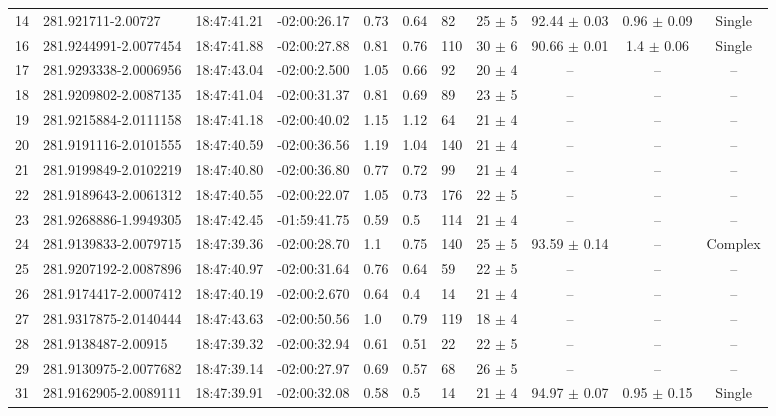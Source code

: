 \begin{table}[htbp!]
\begin{tabular}{llllllllccc}
14  &  281.921711-2.00727  &  18:47:41.21  &  -02:00:26.17  &  0.73  &  0.64  &  82  &  25 $\pm$ 5  &  92.44 $\pm$ 0.03  &  0.96 $\pm$ 0.09  &  Single \\
16  &  281.9244991-2.0077454  &  18:47:41.88  &  -02:00:27.88  &  0.81  &  0.76  &  110  &  30 $\pm$ 6  &  90.66 $\pm$ 0.01  &  1.4 $\pm$ 0.06  &  Single \\
17  &  281.9293338-2.0006956  &  18:47:43.04  &  -02:00:2.500  &  1.05  &  0.66  &  92  &  20 $\pm$ 4  &  --  &  --  &  -- \\
18  &  281.9209802-2.0087135  &  18:47:41.04  &  -02:00:31.37  &  0.81  &  0.69  &  89  &  23 $\pm$ 5  &  --  &  --  &  -- \\
19  &  281.9215884-2.0111158  &  18:47:41.18  &  -02:00:40.02  &  1.15  &  1.12  &  64  &  21 $\pm$ 4  &  --  &  --  &  -- \\
20  &  281.9191116-2.0101555  &  18:47:40.59  &  -02:00:36.56  &  1.19  &  1.04  &  140  &  21 $\pm$ 4  &  --  &  --  &  -- \\
21  &  281.9199849-2.0102219  &  18:47:40.80  &  -02:00:36.80  &  0.77  &  0.72  &  99  &  21 $\pm$ 4  &  --  &  --  &  -- \\
22  &  281.9189643-2.0061312  &  18:47:40.55  &  -02:00:22.07  &  1.05  &  0.73  &  176  &  22 $\pm$ 5  &  --  &  --  &  -- \\
23  &  281.9268886-1.9949305  &  18:47:42.45  &  -01:59:41.75  &  0.59  &  0.5  &  114  &  21 $\pm$ 4  &  --  &  --  &  -- \\
24  &  281.9139833-2.0079715  &  18:47:39.36  &  -02:00:28.70  &  1.1  &  0.75  &  140  &  25 $\pm$ 5  &  93.59 $\pm$ 0.14  &  --  &  Complex \\
25  &  281.9207192-2.0087896  &  18:47:40.97  &  -02:00:31.64  &  0.76  &  0.64  &  59  &  22 $\pm$ 5  &  --  &  --  &  -- \\
26  &  281.9174417-2.0007412  &  18:47:40.19  &  -02:00:2.670  &  0.64  &  0.4  &  14  &  21 $\pm$ 4  &  --  &  --  &  -- \\
27  &  281.9317875-2.0140444  &  18:47:43.63  &  -02:00:50.56  &  1.0  &  0.79  &  119  &  18 $\pm$ 4  &  --  &  --  &  -- \\
28  &  281.9138487-2.00915  &  18:47:39.32  &  -02:00:32.94  &  0.61  &  0.51  &  22  &  22 $\pm$ 5  &  --  &  --  &  -- \\
29  &  281.9130975-2.0077682  &  18:47:39.14  &  -02:00:27.97  &  0.69  &  0.57  &  68  &  26 $\pm$ 5  &  --  &  --  &  -- \\
31  &  281.9162905-2.0089111  &  18:47:39.91  &  -02:00:32.08  &  0.58  &  0.5  &  14  &  21 $\pm$ 4  &  94.97 $\pm$ 0.07  &  0.95 $\pm$ 0.15  &  Single \\

\end{tabular}
\end{table}
